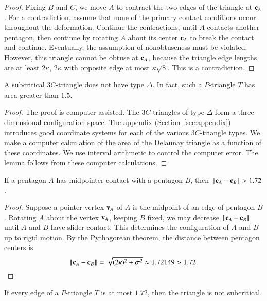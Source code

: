 \begin{proof} Fixing $B$ and $C$, we move $A$ to contract the two
  edges of the triangle at ${\mathbf c}_A$.  For a contradiction, assume that
  none of the primary contact conditions occur throughout the
  deformation.  Continue the contractions, until $A$ contacts another
  pentagon, then continue by rotating $A$ about its center ${\mathbf c}_A$ to
  break the contact and continue.  Eventually, the assumption of
  nonobtuseness must be violated.  However, this triangle cannot be
  obtuse at ${\mathbf c}_A$, because the triangle edge lengths are at least $2
  \kappa$, $2 \kappa$ with opposite edge at most
  $\kappa\sqrt{8}$. This is a contradiction.
\end{proof}

\begin{lemma} A subcritical $3C$-triangle does not have type $\Delta$.
  In fact, such a $P$-triangle $T$ has area greater than $1.5$.
\end{lemma}

\begin{proof} The proof is computer-assisted.  The $3C$-triangles of
  type $\Delta$ form a three-dimensional configuration space.  The
  appendix (Section~\ref{sec:appendix}) introduces good coordinate
  systems for each of the various $3C$-triangle types.  We make a
  computer calculation of the area of the Delaunay triangle as a
  function of these coordinates.  We use interval arithmetic to
  control the computer error.  The lemma follows from these computer
  calculations.
\end{proof}



\begin{lemma}\label{lemma:mid-172}  
  If a pentagon $A$ has midpointer contact with a pentagon $B$, then
  $\norm{\c_A}{\c_B} > 1.72$.
\end{lemma}

\begin{proof} Suppose a pointer vertex ${\mathbf v}_A$ of $A$ is the midpoint of an
  edge of pentagon $B$.  Rotating $A$ about the vertex ${\mathbf v}_A$, keeping
  $B$ fixed, we may decrease $\norm{\c_A}{\c_B}$ until $A$ and $B$
  have slider contact.  This determines the configuration of $A$ and
  $B$ up to rigid motion.  By the Pythagorean theorem, the
  distance between pentagon centers is
\[
\norm{\c_A}{\c_B} = \sqrt{(2\kappa)^2 + \sigma^2} \approx 1.72149 > 1.72.
\] %
\end{proof}

\begin{lemma}\label{lemma:172}
  If every edge of a $P$-triangle $T$ is at most $1.72$, then the
  triangle is not subcritical.
\end{lemma}


